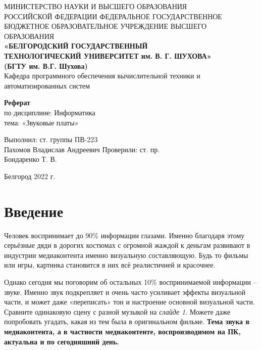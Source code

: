 \documentclass[a4paper,12pt]{extarticle}
\newcommand{\anonsection}[1]{\section*{#1}\addcontentsline{toc}{section}{#1}}
\begin{document}
	\linespread{1.5}
	\setlength{\parskip}{0cm}
	
	\newcommand\textbox[1]{
		\parbox{.45\textwidth}{#1}
	}
	
	
	\justifying
	
	\begin{center}
		\small{
			МИНИСТЕРСТВО НАУКИ И ВЫСШЕГО ОБРАЗОВАНИЯ \\РОССИЙСКОЙ ФЕДЕРАЦИИ
			\bigbreak
			ФЕДЕРАЛЬНОЕ ГОСУДАРСТВЕННОЕ БЮДЖЕТНОЕ ОБРАЗОВАТЕЛЬНОЕ УЧРЕЖДЕНИЕ ВЫСШЕГО ОБРАЗОВАНИЯ \\
			\bigbreak
			\textbf{«БЕЛГОРОДСКИЙ ГОСУДАРСТВЕННЫЙ \\ТЕХНОЛОГИЧЕСКИЙ УНИВЕРСИТЕТ им. В. Г. ШУХОВА»\\ (БГТУ им. В.Г. Шухова)} \\
			\bigbreak
			Кафедра программного обеспечения вычислительной техники и автоматизированных систем\\}
	\end{center}
	
	\vfill
	\begin{center}
		\large{
			\textbf{
				Реферат }}\\
		\normalsize{
			по дисциплине: Информатика \\
			тема: «Звуковые платы»}
	\end{center}
	\vfill
	\hfill\textbox{
		Выполнил: ст. группы ПВ-223\\Пахомов Владислав Андреевич
		\bigbreak
		Проверили: ст. пр.\\Бондаренко Т. В.
	}
	\vfill\begin{center}
		Белгород 2022 г.
	\end{center}
	\newpage
	\renewcommand{\contentsname}{Оглавление}
	\tableofcontents\newpage
	
	
	\anonsection{Введение}
	Человек воспринимает до 90\% информации глазами. Именно благодаря этому серьёзные дяди в дорогих костюмах с огромной жаждой к деньгам развивают в индустрии медиаконтента именно визуальную составляющую. Будь то фильмы или игры, картинка становится в них всё реалистичней и красочнее.
	
	Однако сегодня мы поговорим об остальных 10\% воспринимаемой информации – звуке. Именно звук подкрепляет и очень часто усиливает эффекты визуальной части, и может даже «переписать» тон и настроение основной визуальной части. Сравните одинаковую сцену с разной музыкой на \textit{слайде 1}. Можете даже попробовать угадать, какая из тем была в оригинальном фильме. \textbf{Тема звука в медиаконтента, а в частности медиаконтенте, воспроизводимом на ПК, актуальна и по сегодняшний день.}
	
\end{document}
